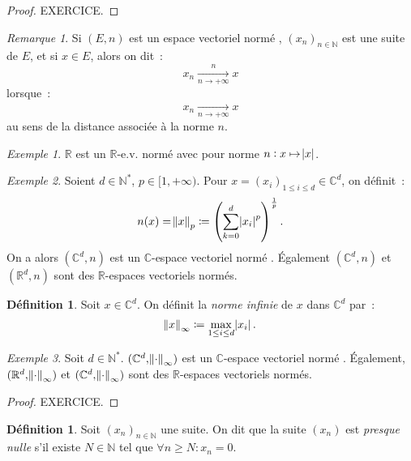\documentclass{report}
\theoremstyle{definition}
\newtheorem{déf}[thm]{Définition}
\theoremstyle{remark}
\newtheorem*{rmq}{Remarque}
\newtheorem{ex}{Exemple}[chapter]
\numberwithin{equation}{section}
\newcommand{\C}{\mathbb C}
\newcommand{\R}{\mathbb R}
\newcommand{\N}{\mathbb N}
\newcommand{\Ns}{\N^{*}}
\newcommand{\seq}[3]{\left(#1_{#2}\right)_{#2 \in #3}}
\newcommand{\mconv}[3]{\xrightarrow[#1 \to #2]{#3}}
\newcommand{\pinfty}{{+\infty}}
\newcommand{\evn}{espace vectoriel normé }
\begin{document}
				\begin{proof} EXERCICE.
				\end{proof}

				\begin{rmq} Si $(E, n)$ est un \evn, $\seq xn\N$ est une suite de $E$, et si $x \in E$, alors on dit~:
				\begin{equation}
					x_n \mconv n\pinfty n x
				\end{equation}
				lorsque~:
				\begin{equation}
					x_n \mconv n\pinfty{} x
				\end{equation}
				au sens de la distance associée à la norme $n$.
				\end{rmq}

				\begin{ex} $\R$ est un $\R$-e.v. normé avec pour norme $n : x \mapsto \abs x$. \end{ex}

				\begin{ex} Soient $d \in \Ns$, $p \in [1, \pinfty)$. Pour $x = (x_i)_{1 \leq i \leq d} \in \C^d$, on définit~:
				\begin{equation}
					n(x) = \norm x_p \coloneqq \left(\sum_{k=0}^d\abs {x_i}^p\right)^{\frac 1p}.
				\end{equation}
				On a alors $(\C^d, n)$ est un $\C$-\evn. Également $(\C^d, n)$ et $(\R^d, n)$  sont des $\R$-espaces vectoriels normés.
				\end{ex}

				\begin{déf} Soit $x \in \C^d$. On définit la \textit{norme infinie} de $x$ dans $\C^d$ par~:
				\begin{equation}
					\norm x_\infty \coloneqq \max_{1 \leq i \leq d}\abs {x_i}.
				\end{equation}
				\end{déf}

				\begin{ex} Soit $d \in \Ns$. $(\C^d, \norm \cdot_\infty)$ est un $\C$-\evn. Également, $(\R^d, \norm \cdot_\infty)$
				et $(\C^d, \norm \cdot_\infty)$ sont des $\R$-espaces vectoriels normés. \end{ex}

				\begin{proof} EXERCICE.
				\end{proof}

				\begin{déf} Soit $\seq xn\N$ une suite. On dit que la suite $(x_n)$ est \textit{presque nulle} s'il existe $N \in \N$ tel que
				$\forall n \geq N : x_n = 0$. \end{déf}
\end{document}
